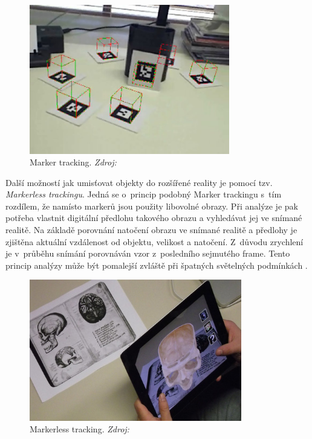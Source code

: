 \documentclass[twoside,12pt]{article}
\begin{document}
\begin{figure}[H]
    \includegraphics[width=330px, center]{images/marker-tracking.jpg}
    \caption[]{Marker tracking. \textit{Zdroj: \cite{marker_tracking}}}
    \label{marker_tracking}
\end{figure}

Další možností jak umisťovat objekty do rozšířené reality je pomocí tzv. \textit{Markerless trackingu}. Jedná se o~princip podobný Marker trackingu s~tím rozdílem, že namísto markerů jsou použity libovolné obrazy. Při analýze je pak potřeba vlastnit digitální předlohu takového obrazu a vyhledávat jej ve snímané realitě. Na základě porovnání natočení obrazu ve snímané realitě a předlohy je zjištěna aktuální vzdálenost od objektu, velikost a natočení. Z~důvodu zrychlení je v~průběhu snímání porovnáván vzor z~posledního sejmutého frame. Tento princip analýzy může být pomalejší zvláště při špatných světelných podmínkách \cite{handbook_of_ar}.

\begin{figure}[H]
    \includegraphics[width=350px, center]{images/markerless-tracking.jpg}
    \caption{Markerless tracking. \textit{Zdroj: \cite{markerless_tracking}}}
    \label{markerless_tracking}
\end{figure}
\end{document}
